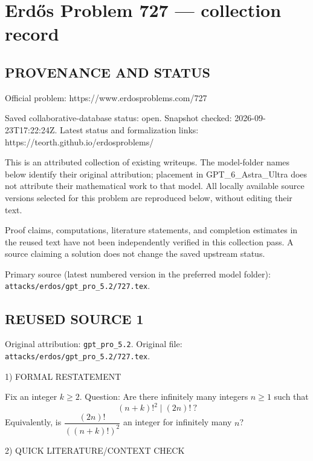 \section*{Erd\H{o}s Problem 727 --- collection record}

\subsection*{PROVENANCE AND STATUS}
Official problem: https://www.erdosproblems.com/727

Saved collaborative-database status: open.
Snapshot checked: 2026-09-23T17:22:24Z.
Latest status and formalization links: https://teorth.github.io/erdosproblems/

This is an attributed collection of existing writeups. The model-folder names below identify their original attribution; placement in GPT\_6\_Astra\_Ultra does not attribute their mathematical work to that model. All locally available source versions selected for this problem are reproduced below, without editing their text.

Proof claims, computations, literature statements, and completion estimates in the reused text have not been independently verified in this collection pass. A source claiming a solution does not change the saved upstream status.

Primary source (latest numbered version in the preferred model folder): \texttt{attacks/erdos/gpt\_pro\_5.2/727.tex}.

\subsection*{REUSED SOURCE 1}
Original attribution: \texttt{gpt\_pro\_5.2}.
Original file: \texttt{attacks/erdos/gpt\_pro\_5.2/727.tex}.


1) FORMAL RESTATEMENT

Fix an integer $k\ge 2$.
Question: Are there infinitely many integers $n\ge 1$ such that
\[
(n+k)!^2 \mid (2n)!\ ?
\]
Equivalently, is $\dfrac{(2n)!}{((n+k)!)^2}$ an integer for infinitely many $n$?

2) QUICK LITERATURE/CONTEXT CHECK

